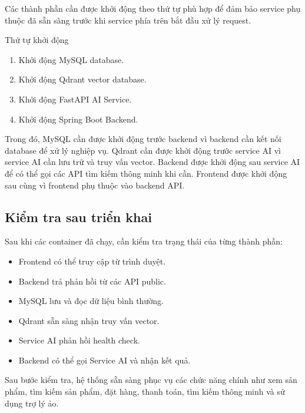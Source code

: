 Các thành phần cần được khởi động theo thứ tự phù hợp để đảm bảo service phụ thuộc đã sẵn sàng trước khi service phía trên bắt đầu xử lý request.

Thứ tự khởi động 

\begin{enumerate}
    \item Khởi động MySQL database.
    \item Khởi động Qdrant vector database.
    \item Khởi động FastAPI AI Service.
    \item Khởi động Spring Boot Backend.
\end{enumerate}

Trong đó, MySQL cần được khởi động trước backend vì backend cần kết nối database để xử lý nghiệp vụ. Qdrant cần được khởi động trước service AI vì service AI cần lưu trữ và truy vấn vector. Backend được khởi động sau service AI để có thể gọi các API tìm kiếm thông minh khi cần. Frontend được khởi động sau cùng vì frontend phụ thuộc vào backend API.

\subsection{Kiểm tra sau triển khai}

Sau khi các container đã chạy, cần kiểm tra trạng thái của từng thành phần:

\begin{itemize}
    \item Frontend có thể truy cập từ trình duyệt.
    \item Backend trả phản hồi từ các API public.
    \item MySQL lưu và đọc dữ liệu bình thường.
    \item Qdrant sẵn sàng nhận truy vấn vector.
    \item Service AI phản hồi health check.
    \item Backend có thể gọi Service AI và nhận kết quả.
\end{itemize}

Sau bước kiểm tra, hệ thống sẵn sàng phục vụ các chức năng chính như xem sản phẩm, tìm kiếm sản phẩm, đặt hàng, thanh toán, tìm kiếm thông minh và sử dụng trợ lý ảo.